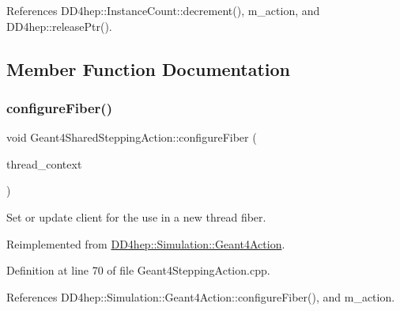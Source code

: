 References D\+D4hep\+::\+Instance\+Count\+::decrement(), m\+\_\+action, and D\+D4hep\+::release\+Ptr().



\subsection{Member Function Documentation}
\hypertarget{class_d_d4hep_1_1_simulation_1_1_geant4_shared_stepping_action_ae023874861eb3048eba53ef6cd253224}{}\label{class_d_d4hep_1_1_simulation_1_1_geant4_shared_stepping_action_ae023874861eb3048eba53ef6cd253224} 
\subsubsection{\texorpdfstring{configure\+Fiber()}{configureFiber()}}
{\footnotesize\ttfamily void Geant4\+Shared\+Stepping\+Action\+::configure\+Fiber (\begin{DoxyParamCaption}\item[{\hyperlink{class_d_d4hep_1_1_simulation_1_1_geant4_context}{Geant4\+Context} $\ast$}]{thread\+\_\+context }\end{DoxyParamCaption})\hspace{0.3cm}{\ttfamily [virtual]}}



Set or update client for the use in a new thread fiber. 



Reimplemented from \hyperlink{class_d_d4hep_1_1_simulation_1_1_geant4_action_a6adc7138508303e4e417cb48a737ab19}{D\+D4hep\+::\+Simulation\+::\+Geant4\+Action}.



Definition at line 70 of file Geant4\+Stepping\+Action.\+cpp.



References D\+D4hep\+::\+Simulation\+::\+Geant4\+Action\+::configure\+Fiber(), and m\+\_\+action.

\hypertarget{class_d_d4hep_1_1_simulation_1_1_geant4_shared_stepping_action_a5128c3fa4f478cda734a35a09ee86ae0}{}\label{class_d_d4hep_1_1_simulation_1_1_geant4_shared_stepping_action_a5128c3fa4f478cda734a35a09ee86ae0} 
